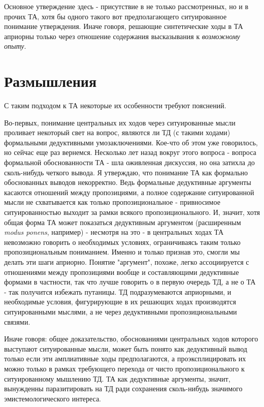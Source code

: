 \documentclass{article}
\begin{document}
Основное утверждение здесь - присутствие в не только рассмотренных, но и в прочих ТА, хотя бы одного такого вот предполагающего ситуированное понимание утверждения. Иначе говоря, решающие синтетические ходы в ТА априорны только через отношение содержания высказывания к \textit{возможному опыту}.

\section{Размышления}

С таким подходом к ТА некоторые их особенности требуют пояснений.

Во-первых, понимание центральных их ходов через ситуированные мысли проливает некоторый свет на вопрос, являются ли ТД (с такими ходами) формальными дедуктивными умозаключениями. Кое-что об этом уже говорилось, но сейчас еще раз вернемся. Несколько лет назад вокруг этого вопроса - вопроса формальной обоснованности ТА - шла оживленная дискуссия, но она затихла до сколь-нибудь четкого вывода. Я утверждаю, что понимание ТА как формально обоснованных выводов некорректно. Ведь формальные дедуктивные аргументы касаются отношений между пропозициями, а полное содержание ситуированной мысли не схватывается как только пропозициональное - привносимое ситуированностью выходит за рамки всякого пропозиционального. И, значит, хотя общая форма ТА может показаться дедуктивным аргументом (расширенным \textit{modus ponens}, например) - несмотря на это - в центральных ходах ТА невозможно говорить о необходимых условиях, ограничиваясь таким только пропозициональным пониманием. Именно и только признав это, смогли мы делать эти шаги априорно. Понятие "аргумент", похоже, легко ассоциируется с отношениями между пропозициями вообще и составляющими дедуктивные формами в частности, так что лучше говорить о в первую очередь ТД, а не о ТА - так получится избежать путаницы. ТД подразумеваются априорными, и необходимые условия, фигурирующие в их решающих ходах производятся ситуированными мыслями, а не через дедуктивными пропозициональными связями.

Иначе говоря: общее доказательство, обоснованиями центральных ходов которого выступают ситуированные мысли, может быть понято как дедуктивный вывод только если эти амплиативные ходы предполагаются, а проэксплицировать их можно только в рамках требующего перехода от чисто пропозиционального к ситуированному мышлению ТД. ТА как дедуктивные аргументы, значит, вынужденны паразитировать на ТД ради сохранения сколь-нибудь значимого эмистемологического интереса.
\end{document}
